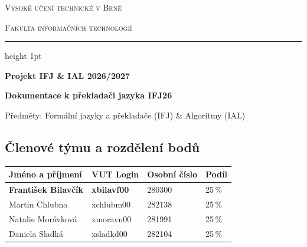 \documentclass[12pt]{article}
\begin{document}
\thispagestyle{empty}

\begin{center}
    {\scshape\Large Vysoké učení technické v Brně \par}
    {\scshape\large Fakulta informačních technologií \par}
    \vspace{0.4cm}
    \hrule height 1pt
    \vspace{1.5cm}

    {\Huge\bfseries\color{brandpurple} Projekt IFJ \& IAL 2026/2027 \par}
    \vspace{0.4cm}
    {\Large\bfseries\color{darkslate} Dokumentace k překladači jazyka IFJ26 \par}
    \vspace{0.3cm}
    {\large Předměty: Formální jazyky a překladače (IFJ) \& Algoritmy (IAL) \par}
    
    \vspace{1.5cm}
\end{center}

\vspace{11em}

\begin{center}
\subsection*{Členové týmu a rozdělení bodů}
\begin{tabular}{llll}
\toprule
\textbf{Jméno a příjmení} & \textbf{VUT Login} & \textbf{Osobní číslo} & \textbf{Podíl} \\
\midrule
\textbf{František Bilavčík} & \textbf{xbilavf00} & 280300 & 25\,\% \\
Martin Chlubna & xchlubm00 & 282138 & 25\,\% \\
Natalie Morávková & xmoravn00 & 281991 & 25\,\% \\
Daniela Sladká & xsladkd00 & 282104 & 25\,\% \\
\bottomrule
\end{tabular}
\end{center}
\end{document}
